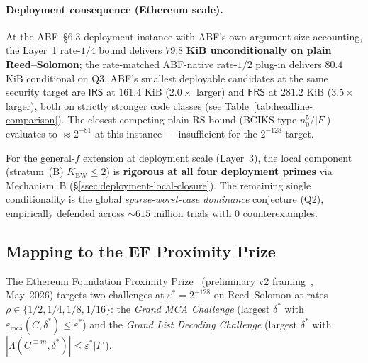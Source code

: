 \documentclass[11pt]{article}
\theoremstyle{definition}
\theoremstyle{remark}
\begin{document}
\paragraph{Deployment consequence (Ethereum scale).}
At the ABF~\S 6.3 deployment instance with ABF's own argument-size
accounting, the Layer~1 rate-$1/4$ bound delivers
$\boldsymbol{79.8}$ \textbf{KiB unconditionally on plain
Reed--Solomon}; the rate-matched ABF-native rate-$1/2$ plug-in
delivers $80.4$ KiB conditional on Q3. ABF's smallest deployable
candidates at the same security target are $\mathsf{IRS}$ at
$161.4$ KiB ($2.0\times$ larger) and $\mathsf{FRS}$ at $281.2$ KiB
($3.5\times$ larger), both on strictly stronger code classes (see
Table~\ref{tab:headline-comparison}). The closest competing plain-RS
bound (BCIKS-type $n_0^5/|F|$) evaluates to $\approx 2^{-81}$ at
this instance --- insufficient for the $2^{-128}$ target.

For the general-$f$ extension at deployment scale (Layer~3), the
local component (stratum~(B) $K_{\mathrm{BW}} \leq 2$) is
\textbf{rigorous at all four deployment primes} via Mechanism~B
(\S\ref{ssec:deployment-local-closure}). The remaining single
conditionality is the global \emph{sparse-worst-case dominance}
conjecture (Q2), empirically defended across ${\sim}615$ million
trials with $0$ counterexamples.

\subsection{Mapping to the EF Proximity Prize}
\label{ssec:prize-map}

The Ethereum Foundation Proximity Prize~\cite{EFPrize}
(preliminary v2 framing~\cite{EFPrizeSite}, May~2026) targets two
challenges at $\varepsilon^* = 2^{-128}$ on Reed--Solomon at rates
$\rho \in \{1/2, 1/4, 1/8, 1/16\}$: the \emph{Grand MCA Challenge}
(largest $\delta^*$ with $\varepsilon_{\mathrm{mca}}(C, \delta^*) \leq
\varepsilon^*$) and the \emph{Grand List Decoding Challenge}
(largest $\delta^*$ with $|\Lambda(C^{\equiv m}, \delta^*)| \leq
\varepsilon^* |F|$).
\end{document}

